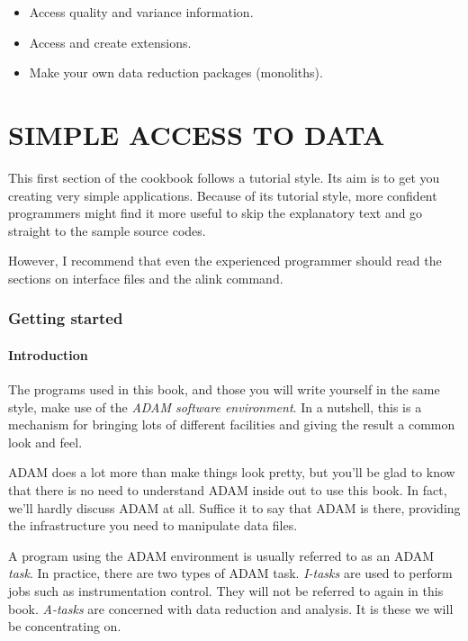 \begin{itemize}
\item Access quality and variance information.
\item Access and create extensions.
\item Make your own data reduction packages (monoliths).
\end{itemize}

\newpage

\part{SIMPLE ACCESS TO DATA}

\markright{\stardocname}

This first section of the cookbook follows a tutorial style. Its aim is
to get you creating very simple applications. Because of its tutorial
style, more confident programmers might find it more useful to skip the
explanatory text and go straight to the sample source codes.

However, I recommend that even the experienced programmer should read the
sections on {\sf interface files} and the {\sf alink} command.

\newpage

\section{Getting started}

\subsection{Introduction}

The programs used in this book, and those you will write yourself in the
same style, make use of the {\it ADAM software environment}.  In a
nutshell, this is a mechanism for bringing  lots of different
facilities and giving the result a common look and feel.

ADAM does a lot more than make things look pretty, but you'll be glad to
know that there is no need to understand ADAM inside out to use this book.
In fact, we'll hardly discuss ADAM at all. Suffice it to say that ADAM is
there, providing the infrastructure you need to manipulate data files.

       A program using the ADAM environment is usually referred
       to as an ADAM {\it task}. In practice, there are two types
       of ADAM task. {\it I-tasks} are used to perform jobs such
       as instrumentation control. They will not be referred to again in
       this book. {\it A-tasks} are concerned with data reduction and
       analysis. It is these we will be concentrating on.

